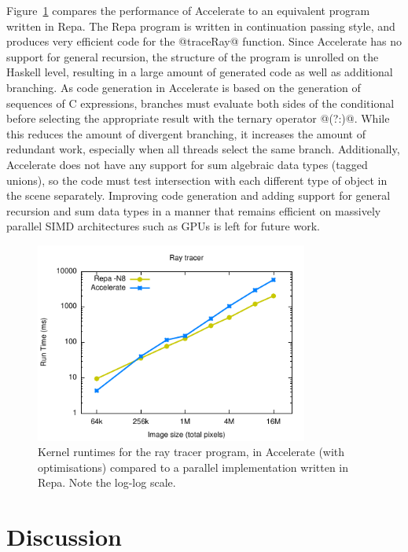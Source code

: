 Figure~\ref{fig:ray} compares the performance of Accelerate to an equivalent
program written in Repa. The Repa program is written in continuation passing
style, and produces very efficient code for the @traceRay@ function. Since
Accelerate has no support for general recursion, the structure of the program is
unrolled on the Haskell level, resulting in a large amount of generated code as
well as additional branching. As code generation in Accelerate is based on the
generation of sequences of C expressions, branches must evaluate both sides of
the conditional before selecting the appropriate result with the ternary
operator @(?:)@. While this reduces the amount of divergent branching, it
increases the amount of redundant work, especially when all threads select the
same branch. Additionally, Accelerate does not have any support for sum
algebraic data types (tagged unions), so the code must test intersection with
each different type of object in the scene separately. Improving code generation
and adding support for general recursion and sum data types in a manner that
remains efficient on massively parallel SIMD architectures such as GPUs is left
for future work.

\begin{figure}
    \begin{center}
        \includegraphics[width=0.8\textwidth]{images/results/ray/ray}
    \end{center}
    \caption[Ray tracing kernel benchmarks]{Kernel runtimes for the ray tracer
        program, in Accelerate (with optimisations) compared to a parallel
    implementation written in Repa. Note the log-log scale.}
\label{fig:ray}
\end{figure}


\section{Discussion}

